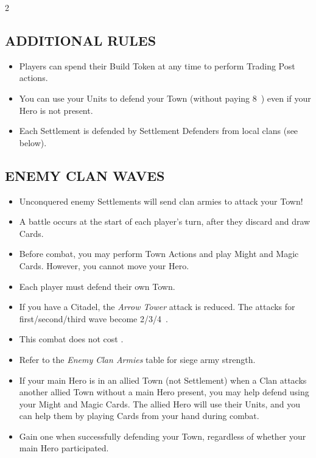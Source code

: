 \begin{multicols}{2}
\subsection*{\MakeUppercase{Additional Rules}}

\begin{itemize}
  \item Players can spend their Build Token at any time to perform Trading Post actions.
  \item You can use your Units to defend your Town (without paying 8~) even if your Hero is not present.
  \item Each Settlement is defended by Settlement Defenders from local clans (see below).
\end{itemize}

\subsection*{\MakeUppercase{Enemy clan waves}}
\begin{itemize}
  \item Unconquered enemy Settlements will send clan armies to attack your Town!
  \item A battle occurs at the start of each player's turn, after they discard and draw Cards.
  \item Before combat, you may perform Town Actions and play Might and Magic Cards. However, you cannot move your Hero.
  \item Each player must defend their own Town.
  \item If you have a Citadel, the \textit{Arrow Tower} attack is reduced. The attacks for first/second/third wave become 2/3/4~.
  \item This combat does not cost .
  \item Refer to the \textit{Enemy Clan Armies} table for siege army strength.
  \item If your main Hero is in an allied Town (not Settlement) when a Clan attacks another allied Town without a main Hero present, you may help defend using your Might and Magic Cards. The allied Hero will use their Units, and you can help them by playing Cards from your hand during combat.
  \item Gain one  when successfully defending your Town, regardless of whether your main Hero participated.
\end{itemize}


\end{multicols}
